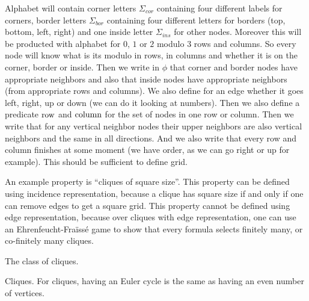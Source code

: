 {
Alphabet will contain corner letters $\Sigma_{cor}$ containing four different labels for corners, border letters $\Sigma_{bor}$
containing four different letters for borders (top, bottom, left, right) and one inside letter $\Sigma_{ins}$ for other nodes.
Moreover this will be producted with alphabet for $0$, $1$ or $2$ modulo $3$ rows and columns. So every node will
know what is its modulo in rows, in columns and whether it is on the corner, border or inside.
Then we write in $\phi$ that corner and border nodes have appropriate neighbors and also that inside nodes have
appropriate neighbors (from appropriate rows and columns). We also define for an edge whether it goes
left, right, up or down (we can do it looking at numbers). Then we also define a predicate $\textup{row}$ and $\textup{column}$
for the set of nodes in one row or column. Then we write that for any vertical neighbor nodes their upper neighbors are also vertical
neighbors and the same in all directions. And we also write that every row and column finishes at some moment (we have order,
as we can go right or up for example). This should be sufficient to define grid.
}

{An example property is ``cliques of square size''. This property can be defined using incidence 
representation, because a clique has square size  if and only if one can remove edges to get a square grid. This property cannot be defined using edge representation, because over cliques with edge representation, one can use 
an Ehrenfeucht-Fra\"iss\'e game to show that every \mso formula selects finitely many, or co-finitely many cliques.
}


{The class of cliques.
}


{
Cliques.  For cliques, having an Euler cycle is the same as having an even number of vertices.
}

